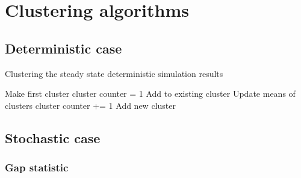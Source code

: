 
\section{Clustering algorithms}

\subsection{Deterministic case}
\begin{algorithm}
\label{alg:DetClustering}
  \caption{Clustering the steady state deterministic simulation results}
 \begin{algorithmic}[1]
    \Statex
      		\State Make first cluster
      		\State cluster counter = 1
      	\Else
      					\State Add to existing cluster
      					\State Update means of clusters
      			\EndIf
      				\State cluster counter +=  1
      				\State Add new cluster
      			\EndIf
      		\EndFor
      	\EndIf
      \EndFor
  \end{algorithmic}
\end{algorithm}

\newpage
\subsection{Stochastic case}
\subsubsection{Gap statistic}

